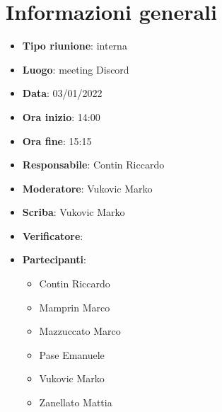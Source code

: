 \section{Informazioni generali}
\begin{itemize}
  \item \textbf{Tipo riunione}: interna
  \item \textbf{Luogo}: meeting Discord
  \item \textbf{Data}: 03/01/2022
  \item \textbf{Ora inizio}: 14:00
  \item \textbf{Ora fine}: 15:15
  \item \textbf{Responsabile}: Contin Riccardo
  \item \textbf{Moderatore}: Vukovic Marko
  \item \textbf{Scriba}: Vukovic Marko
  \item \textbf{Verificatore}: 
  \item \textbf{Partecipanti}:
  \begin{itemize}
    \item Contin Riccardo
    \item Mamprin Marco
    \item Mazzuccato Marco
    \item Pase Emanuele
    \item Vukovic Marko
    \item Zanellato Mattia
  \end{itemize}
\end{itemize}
